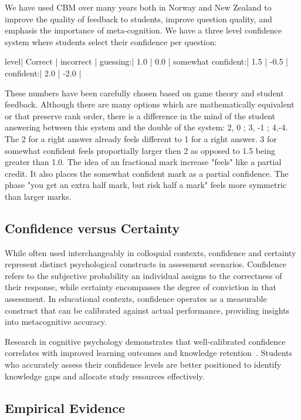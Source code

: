 \documentclass[sigconf]{acmart}
\begin{document}
We have used CBM over many years both in Norway and New Zealand to improve the quality of feedback to students, improve question quality, and emphasis the importance of meta-cognition. We have a three level confidence system where students select their confidence per question:
\begin{tabular}
  level| Correct | incorrect |
  guessing:| 1.0 | 0.0 |
  somewhat confident:| 1.5 | -0.5 |
  confident:| 2.0 | -2.0 |
\end{tabular}

These numbers have been carefully chosen based on game theory and student feedback.  Although there are many options which are mathematically equivalent or that preserve rank order, there is a difference in the mind of the student answering between this system and the double of the system: 2, 0 ; 3, -1 ; 4,-4.  The 2 for a right answer already feels different to 1 for a right answer.  3 for somewhat confident feels proportially larger then 2 as opposed to 1.5 being greater than 1.0.  The idea of an fractional mark increase "feels" like a partial credit.  It also places the somewhat confident mark as a partial confidence.  The phase "you get an extra half mark, but risk half a mark" feels more symmetric than larger marks.


\subsection{Confidence versus Certainty}

While often used interchangeably in colloquial contexts, confidence and certainty represent distinct psychological constructs in assessment scenarios. Confidence refers to the subjective probability an individual assigns to the correctness of their response, while certainty encompasses the degree of conviction in that assessment. In educational contexts, confidence operates as a measurable construct that can be calibrated against actual performance, providing insights into metacognitive accuracy.

Research in cognitive psychology demonstrates that well-calibrated confidence correlates with improved learning outcomes and knowledge retention~\cite{dunlosky2011four}. Students who accurately assess their confidence levels are better positioned to identify knowledge gaps and allocate study resources effectively.

\subsection{Empirical Evidence}
\end{document}

